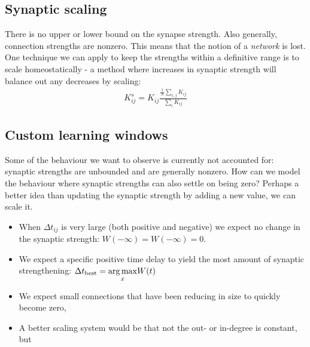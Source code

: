 \subsection{Synaptic scaling}
There is no upper or lower bound on the synapse strength. Also generally, connection strengths are nonzero. This means that the notion of a \textsl{network} is lost.\\
One technique we can apply to keep the strengths within a definitive range is to scale homeostatically - a method where increases in synaptic strength will balance out any decreases by scaling:
\begin{align}
K_{ij}^s = K_{ij} \frac{\frac{1}{N} \sum_{i,j} K_{ij}}{\sum_{i} K_{ij}}
\end{align}


\subsection{Custom learning windows}
Some of the behaviour we want to observe is currently not accounted for: synaptic strengths are unbounded and are generally nonzero. How can we model the behaviour where synaptic strengths can also settle on being zero? Perhaps a better idea than updating the synaptic strength by adding a new value, we can scale it.
\begin{itemize}
\item When $\Delta t_{ij}$ is very large (both positive and negative) we expect no change in the synaptic strength: $W(-\infty) = W(-\infty) = 0$. 
\item We expect a specific positive time delay to yield the most amount of synaptic strengthening: $\Delta t_{\rm best} = \underset{x}{\arg \max}  W(t)$
\item We expect small connections that have been reducing in size to quickly become zero, 
\item A better scaling system would be that not the out- or in-degree is constant, but 
\end{itemize}




\small{}

\label{LastPage}~


